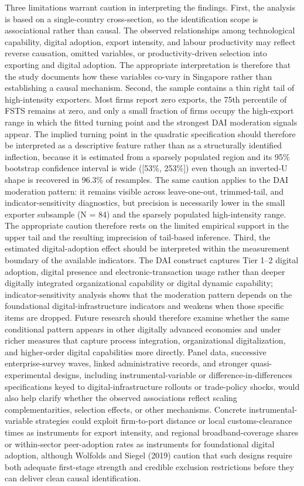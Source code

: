 \documentclass[
  12pt,a4paper]{article}
\begin{document}
Three limitations warrant caution in interpreting the findings. First,
the analysis is based on a single-country cross-section, so the
identification scope is associational rather than causal. The observed
relationships among technological capability, digital adoption, export
intensity, and labour productivity may reflect reverse causation,
omitted variables, or productivity-driven selection into exporting and
digital adoption. The appropriate interpretation is therefore that the
study documents how these variables co-vary in Singapore rather than
establishing a causal mechanism. Second, the sample contains a thin
right tail of high-intensity exporters. Most firms report zero exports,
the 75th percentile of FSTS remains at zero, and only a small fraction
of firms occupy the high-export range in which the fitted turning point
and the strongest DAI moderation signals appear. The implied turning
point in the quadratic specification should therefore be interpreted as
a descriptive feature rather than as a structurally identified
inflection, because it is estimated from a sparsely populated region and
its 95\% bootstrap confidence interval is wide ({[}53\%, 253\%{]}) even
though an inverted-U shape is recovered in 96.3\% of resamples. The same
caution applies to the DAI moderation pattern: it remains visible across
leave-one-out, trimmed-tail, and indicator-sensitivity diagnostics, but
precision is necessarily lower in the small exporter subsample (N = 84)
and the sparsely populated high-intensity range. The appropriate caution
therefore rests on the limited empirical support in the upper tail and
the resulting imprecision of tail-based inference. Third, the estimated
digital-adoption effect should be interpreted within the measurement
boundary of the available indicators. The DAI construct captures Tier
1--2 digital adoption, digital presence and electronic-transaction usage
rather than deeper digitally integrated organizational capability or
digital dynamic capability; indicator-sensitivity analysis shows that
the moderation pattern depends on the foundational
digital-infrastructure indicators and weakens when those specific items
are dropped. Future research should therefore examine whether the same
conditional pattern appears in other digitally advanced economies and
under richer measures that capture process integration, organizational
digitalization, and higher-order digital capabilities more directly.
Panel data, successive enterprise-survey waves, linked administrative
records, and stronger quasi-experimental designs, including
instrumental-variable or difference-in-differences specifications keyed
to digital-infrastructure rollouts or trade-policy shocks, would also
help clarify whether the observed associations reflect scaling
complementarities, selection effects, or other mechanisms. Concrete
instrumental-variable strategies could exploit firm-to-port distance or
local customs-clearance times as instruments for export intensity, and
regional broadband-coverage shares or within-sector peer-adoption rates
as instruments for foundational digital adoption, although Wolfolds and
Siegel (2019) caution that such designs require both adequate
first-stage strength and credible exclusion restrictions before they can
deliver clean causal identification.
\end{document}
